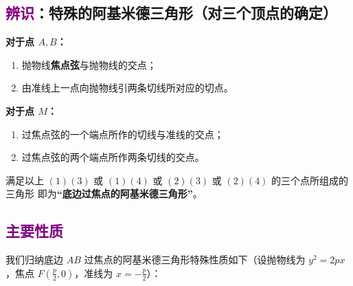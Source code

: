\documentclass[UTF8]{ctexart}
\begin{document}
	\subsection{\textcolor{purple}{辨识}：特殊的阿基米德三角形（对三个顶点的确定）}

	\textbf{对于点 $A,B$：}
	\begin{enumerate}
		\item[(1)] 抛物线\textbf{焦点弦}与抛物线的交点；
		\item[(2)] 由准线上一点向抛物线引两条切线所对应的切点。
	\end{enumerate}
	
	\textbf{对于点 $M$：}
	\begin{enumerate}
		\item[(3)] 过焦点弦的一个端点所作的切线与准线的交点；
		\item[(4)] 过焦点弦的两个端点所作两条切线的交点。
	\end{enumerate}
	
	满足以上 $(1)(3)$ 或 $(1)(4)$ 或 $(2)(3)$ 或 $(2)(4)$ 的三个点所组成的三角形
	即为\textbf{“底边过焦点的阿基米德三角形”}。
	


	
	\subsection{\textcolor{purple}{主要性质}}
	
	我们归纳底边 $AB$ 过焦点的阿基米德三角形特殊性质如下（设抛物线为 $y^2=2px$，焦点 $F\!\left(\frac p2,0\right)$，准线为 $x=-\frac p2$）：
	
\end{document}
